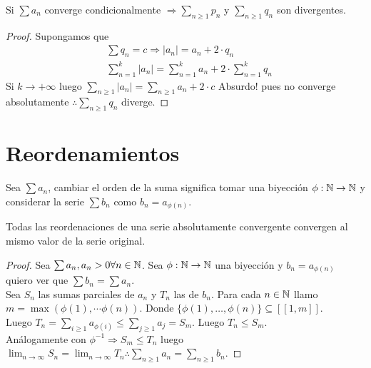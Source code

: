 \begin{theorem}
  Si \(\sum a_n\) converge condicionalmente \(\Rightarrow \sum_{n \geq 1} p_n\) y \(\sum_{n \geq 1} q_n\) son divergentes.

  \begin{proof}
    Supongamos que \begin{align*}
      & \sum q_n = c \Rightarrow |a_n| = a_n + 2 \cdot q_n \\
      & \sum_{n = 1}^k |a_n| = \sum_{n = 1}^k a_n + 2 \cdot \sum_{n = 1}^k q_n
    \end{align*}
    Si \(k \to +\infty\) luego \(\sum_{n \geq 1} |a_n| = \sum_{n \geq 1} a_n + 2 \cdot c\) Absurdo! pues no converge absolutamente \(\therefore \sum_{n \geq 1} q_n\) diverge.
  \end{proof}
\end{theorem}

\section{Reordenamientos}

\begin{definition}
  Sea \(\sum a_n\), cambiar el orden de la suma significa tomar una biyección \(\phi: \mathbb{N} \to \mathbb{N} \) y considerar la serie \(\sum b_n\) como \(b_n = a_{\phi(n)} \).
\end{definition}

\begin{theorem}
  Todas las reordenaciones de una serie absolutamente convergente convergen al mismo valor de la serie original.
  \begin{proof}
    Sea \(\sum a_n, a_n > 0 \forall n \in \mathbb{N} \). Sea \(\phi: \mathbb{N} \to \mathbb{N} \) una biyección y \(b_n = a_{\phi(n)} \) quiero ver que \(\sum b_n = \sum a_n\). \\
    Sea \(S_n\) las sumas parciales de \(a_n\) y \(T_n\) las de \(b_n\). Para cada \(n \in \mathbb{N} \) llamo \(m = \max(\phi(1), \cdots \phi(n))\). Donde \(\{ \phi(1), \ldots, \phi(n) \} \subseteq [ [ 1, m ] ] \). \\
    Luego \(T_n = \sum_{i \geq 1} a_{\phi(i)} \leq \sum_{j \geq 1} a_j = S_m\). Luego \(T_n \leq S_m\). \\
    Análogamente con \(\phi^{-1} \Rightarrow S_m \leq T_n\) luego \(\lim_{n \to \infty} S_n = \lim_{n \to \infty} T_n \therefore \sum_{n \geq 1} a_n = \sum_{n \geq 1} b_n\).
  \end{proof}
\end{theorem}

